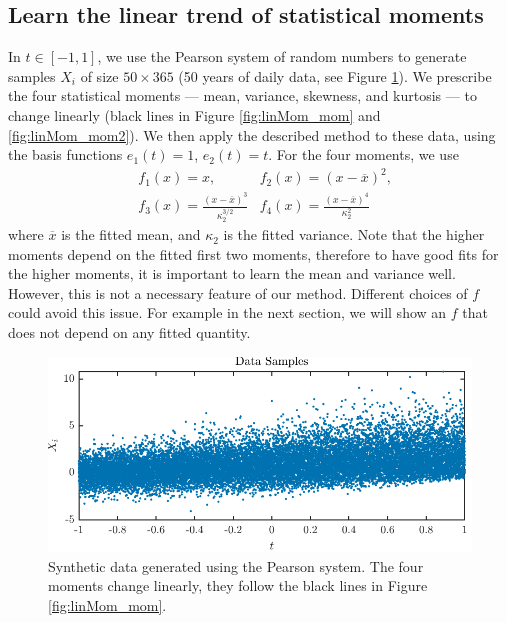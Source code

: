 \documentclass[11pt,letterpaper]{article}
\begin{document}
\subsection{Learn the linear trend of statistical moments}\label{sec:numerical_mom}
In $t\in [-1,1]$, we use the Pearson system of random numbers to generate samples $X_i$ of size $50\times 365$ (50 years of daily data, see Figure \ref{fig:linMon_data}). We prescribe the four statistical moments --- mean, variance, skewness, and kurtosis --- to change linearly (black lines in Figure \ref{fig:linMom_mom} and \ref{fig:linMom_mom2}). We then apply the described method to these data, using the basis functions $e_1(t) = 1$, $e_2(t) = t$. For the four moments, we use 
\begin{align}
    &f_1(x) = x, &f_2(x) = (x-\overline{x})^2,\\
    &f_3(x) = \frac{(x-\overline{x})^3}{\kappa_2^{3/2}} & f_4(x) = \frac{(x-\overline{x})^4}{\kappa_2^{2}}
\end{align}
where $\overline{x}$ is the fitted mean, and $\kappa_2$ is the fitted variance. Note that the higher moments depend on the fitted first two moments, therefore to have good fits for the higher moments, it is important to learn the mean and variance well. However, this is not a necessary feature of our method. Different choices of $f$ could avoid this issue. For example in the next section, we will show an $f$ that does not depend on any fitted quantity. 
\begin{figure}
    \centering
    \includegraphics{figs/linMom_data}
    \caption{Synthetic data generated using the Pearson system. The four moments change linearly, they follow the black lines in Figure \ref{fig:linMom_mom}.}
    \label{fig:linMon_data}
\end{figure}
\end{document}
